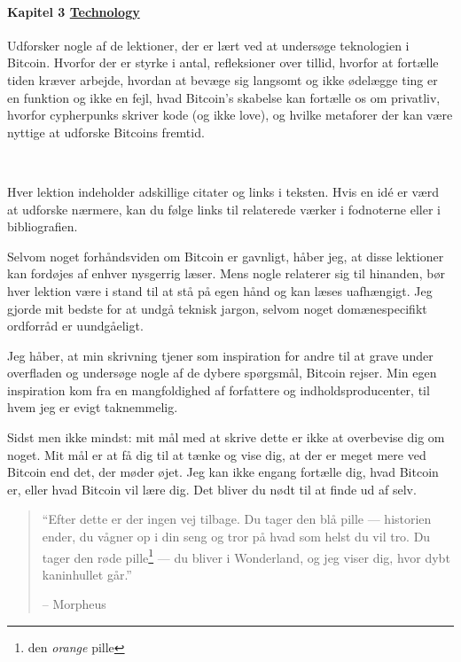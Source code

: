 \paragraph{Kapitel 3 \hyperref[ch:technology]{Technology}} 
Udforsker nogle af de lektioner, der er lært ved at undersøge teknologien i 
Bitcoin. Hvorfor der er styrke i antal, refleksioner over tillid, hvorfor at 
fortælle tiden kræver arbejde, hvordan at bevæge sig langsomt og ikke ødelægge 
ting er en funktion og ikke en fejl, hvad Bitcoin's skabelse kan fortælle os om
privatliv, hvorfor cypherpunks skriver kode (og ikke love), og hvilke metaforer 
der kan være nyttige at udforske Bitcoins fremtid.

~

Hver lektion indeholder adskillige citater og links i teksten. Hvis en idé er
værd at udforske nærmere, kan du følge links til relaterede værker i
fodnoterne eller i bibliografien.

Selvom noget forhåndsviden om Bitcoin er gavnligt, håber jeg, at disse
lektioner kan fordøjes af enhver nysgerrig læser. Mens nogle relaterer sig til 
hinanden, bør hver lektion være i stand til at stå på egen hånd og kan læses 
uafhængigt. Jeg gjorde mit bedste for at undgå teknisk jargon, selvom noget 
domænespecifikt ordforråd er uundgåeligt.

Jeg håber, at min skrivning tjener som inspiration for andre til at grave under
overfladen og undersøge nogle af de dybere spørgsmål, Bitcoin rejser. Min egen
inspiration kom fra en mangfoldighed af forfattere og indholdsproducenter, til 
hvem jeg er evigt taknemmelig.

Sidst men ikke mindst: mit mål med at skrive dette er ikke at overbevise dig om 
noget. Mit mål er at få dig til at tænke og vise dig, at der er meget mere ved 
Bitcoin end det, der møder øjet. Jeg kan ikke engang fortælle dig, hvad Bitcoin 
er, eller hvad Bitcoin vil lære dig. Det bliver du nødt til at finde ud af selv.

\begin{quotation}\begin{samepage}
\enquote{Efter dette er der ingen vej tilbage. Du tager den blå pille --- 
historien ender, du vågner op i din seng og tror på hvad som helst du vil tro. 
Du tager den røde pille\footnote{den \textit{orange} pille} --- du bliver i 
Wonderland, og jeg viser dig, hvor dybt kaninhullet går.}
\begin{flushright} -- Morpheus
\end{flushright}\end{samepage}\end{quotation}

